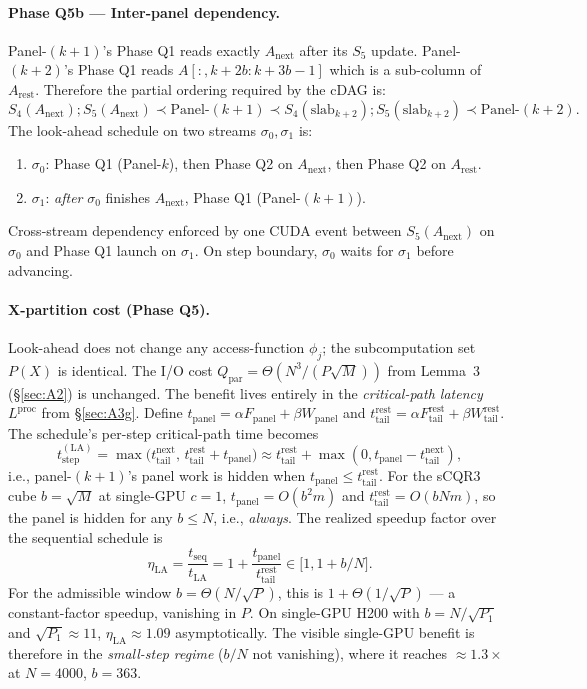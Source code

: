 \documentclass[11pt]{article}
\begin{document}
\paragraph{Phase Q5b --- Inter-panel dependency.}
Panel-$(k{+}1)$'s Phase Q1 reads exactly $A_{\text{next}}$ after its
$S_5$ update. Panel-$(k{+}2)$'s Phase Q1 reads $A[:, k{+}2b : k{+}3b{-}1]$
which is a sub-column of $A_{\text{rest}}$. Therefore the partial
ordering required by the cDAG is:
\[
  S_4(A_{\text{next}}); S_5(A_{\text{next}}) \prec
  \text{Panel-}(k{+}1) \prec S_4(\text{slab}_{k{+}2}); S_5(\text{slab}_{k{+}2})
  \prec \text{Panel-}(k{+}2).
\]
The look-ahead schedule on two streams $\sigma_0, \sigma_1$ is:
\begin{enumerate}[leftmargin=2em]
  \item $\sigma_0$: Phase Q1 (Panel-$k$), then Phase Q2 on
        $A_{\text{next}}$, then Phase Q2 on $A_{\text{rest}}$.
  \item $\sigma_1$: \emph{after} $\sigma_0$ finishes $A_{\text{next}}$,
        Phase Q1 (Panel-$(k{+}1)$).
\end{enumerate}
Cross-stream dependency enforced by one CUDA event between
$S_5(A_{\text{next}})$ on $\sigma_0$ and Phase Q1 launch on $\sigma_1$.
On step boundary, $\sigma_0$ waits for $\sigma_1$ before advancing.

\paragraph{X-partition cost (Phase Q5).}
Look-ahead does not change any access-function $\phi_j$; the
subcomputation set $P(X)$ is identical. The I/O cost
$Q_{\text{par}} = \Theta(N^3/(P\sqrt{M}))$ from Lemma~3
(\S\ref{sec:A2}) is unchanged. The benefit lives entirely in the
\emph{critical-path latency} $L^{\text{proc}}$ from \S\ref{sec:A3g}.
Define $t_{\text{panel}} = \alpha F_{\text{panel}} + \beta
W_{\text{panel}}$ and $t_{\text{tail}}^{\text{rest}} = \alpha
F_{\text{tail}}^{\text{rest}} + \beta W_{\text{tail}}^{\text{rest}}$.
The schedule's per-step critical-path time becomes
\[
  t_{\text{step}}^{(\text{LA})} = \max\big(t_{\text{tail}}^{\text{next}},\,
  t_{\text{tail}}^{\text{rest}} + t_{\text{panel}}\big)
  \approx t_{\text{tail}}^{\text{rest}} + \max(0, t_{\text{panel}} -
  t_{\text{tail}}^{\text{next}}),
\]
i.e., panel-$(k{+}1)$'s panel work is hidden when
$t_{\text{panel}} \le t_{\text{tail}}^{\text{rest}}$. For the
sCQR3 cube $b = \sqrt{M}$ at single-GPU $c = 1$,
$t_{\text{panel}} = O(b^2 m)$ and $t_{\text{tail}}^{\text{rest}}
= O(b N m)$, so the panel is hidden for any $b \le N$, i.e.,
\emph{always}. The realized speedup factor over the sequential
schedule is
\[
  \boxed{\;\eta_{\text{LA}} = \frac{t_{\text{seq}}}{t_{\text{LA}}} =
  1 + \frac{t_{\text{panel}}}{t_{\text{tail}}^{\text{rest}}}
  \in \big[1, 1 + b/N\big].\;}
\]
For the admissible window $b = \Theta(N/\sqrt{P})$, this is
$1 + \Theta(1/\sqrt{P})$ --- a constant-factor speedup, vanishing in
$P$. On single-GPU H200 with $b = N/\sqrt{P_1}$ and $\sqrt{P_1} \approx
11$, $\eta_{\text{LA}} \approx 1.09$ asymptotically. The visible
single-GPU benefit is therefore in the \emph{small-step regime}
($b/N$ not vanishing), where it reaches $\approx 1.3{\times}$ at
$N=4000$, $b=363$.
\end{document}
